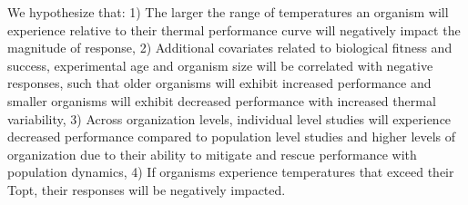 \documentclass[12pt,twoside]{reedthesis}
\begin{document}
We hypothesize that: 1) The larger the range of temperatures an organism will experience relative to their thermal performance curve will negatively impact the magnitude of response, 2) Additional covariates related to biological fitness and success, experimental age and organism size will be correlated with negative responses, such that older organisms will exhibit increased performance and smaller organisms will exhibit decreased performance with increased thermal variability, 3) Across organization levels, individual level studies will experience decreased performance compared to population level studies and higher levels of organization due to their ability to mitigate and rescue performance with population dynamics, 4) If organisms experience temperatures that exceed their Topt, their responses will be negatively impacted.
\end{document}
